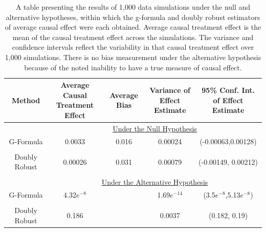 \begin{table}[h!]
\centering
\begin{tabular}{c | c c c c }
Method & \shortstack{Average Causal \\ Treatment Effect} & Average Bias & \shortstack{Variance of \\ Effect Estimate} & \shortstack{95\% Conf. Int.\\ of Effect Estimate} \\
\hline 
& \multicolumn{4}{c}{\underline{Under the Null Hypothesis}} \\
G-Formula & 0.0033 & 0.016 & 0.00024&(-0.00063,0.00128)\\ \\ 
Doubly Robust & 0.00026 & 0.031& 0.00079 & (-0.00149, 0.00212)\\ \\ 
& \multicolumn{4}{c}{\underline{Under the Alternative Hypothesis}} \\
G-Formula & 4.32$e^{-8}$ & & 1.69$e^{-14}$ &(3.5$e^{-8}$,5.13$e^{-8}$) \\ \\ 
Doubly Robust & 0.186 & & 0.0037  & (0.182, 0.19)
\end{tabular} \\
\centering
\caption[Simulation results]{A table presenting the results of 1,000 data simulations under the null and alternative hypotheses, within which the g-formula and doubly robust estimators of average causal effect were each obtained.  Average causal treatment effect is the mean of the causal treatment effect across the simulations.  The variance and confidence intervals reflect the variability in that causal treatment effect over 1,000 simulations. There is no bias measurement under the alternative hypothesis because of the noted inability to have a true measure of causal effect.\label{simdata}}
\end{table}

